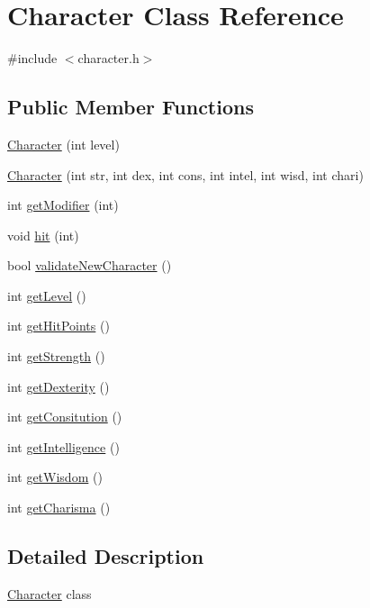 \hypertarget{class_character}{}\section{Character Class Reference}
\label{class_character}


{\ttfamily \#include $<$character.\+h$>$}

\subsection*{Public Member Functions}
\begin{DoxyCompactItemize}
\item 
\hyperlink{class_character_abad90f482dacecabe0d93c5d8d1daa49}{Character} (int level)
\item 
\hyperlink{class_character_aa04e91f7361d166f32fb44a9b31f22ab}{Character} (int str, int dex, int cons, int intel, int wisd, int chari)
\item 
int \hyperlink{class_character_ac508b5e750470649d53cb408258357c4}{get\+Modifier} (int)
\item 
void \hyperlink{class_character_a2261aeb45173d9da1e8ff76a1db81928}{hit} (int)
\item 
bool \hyperlink{class_character_adae2bb0e0bb6b8d010be6d1ac3b1fd5f}{validate\+New\+Character} ()
\item 
int \hyperlink{class_character_ade8602e9521fc4c1849d1d1026bc0399}{get\+Level} ()
\item 
int \hyperlink{class_character_ac28870a30c9b451f55c3e27adaabfbfa}{get\+Hit\+Points} ()
\item 
int \hyperlink{class_character_a8ccbb82b13e59f02c9df0b321fae577d}{get\+Strength} ()
\item 
int \hyperlink{class_character_a86b9d59f326c3df44a6bf2484fd95a7c}{get\+Dexterity} ()
\item 
int \hyperlink{class_character_abaf92d71e605de991e50fb6871904452}{get\+Consitution} ()
\item 
int \hyperlink{class_character_a0cd463a2b68c2cc2b73707b859709635}{get\+Intelligence} ()
\item 
int \hyperlink{class_character_a4d4d5548ed8ed813e4f59f123180afcb}{get\+Wisdom} ()
\item 
int \hyperlink{class_character_af03c7318bd3015262a0f4873b74a1d51}{get\+Charisma} ()
\end{DoxyCompactItemize}


\subsection{Detailed Description}
\hyperlink{class_character}{Character} class 

